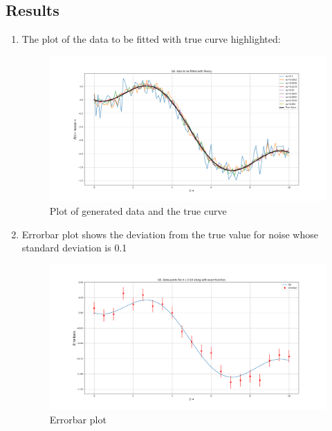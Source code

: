 \documentclass[12pt, a4paper]{report}
\begin{document}
\subsection*{Results}
\begin{enumerate}
\item The plot of the data to be fitted with true curve highlighted:
\begin{figure}[H]
	\includegraphics[scale=0.35]{Figure_2.png} 
	\caption{Plot of generated data and the true curve}
	\label{fig:rawdata}
\end{figure}

\clearpage

\item Errorbar plot shows the deviation from the true value for noise whose standard deviation is 0.1 
\begin{figure}[H]
	\includegraphics[scale=0.35]{Figure_3.png}
	\caption{Errorbar plot}
	\label{fig:errobars}
\end{figure}


\end{enumerate}
\end{document}
